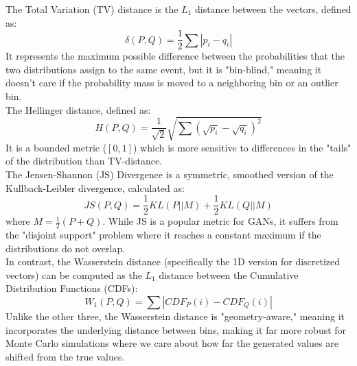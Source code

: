 The Total Variation (TV) distance is the $L_1$ distance between the vectors, defined as:
\begin{equation}
    \label{eq: TV_distance}
    \delta(P, Q) = \frac{1}{2} \sum |p_i - q_i|
\end{equation}
It represents the maximum possible difference between the probabilities that the two distributions assign to the same event,
but it is "bin-blind," meaning it doesn't care if the probability mass is moved to a neighboring bin or an outlier bin.\\
The Hellinger distance, defined as:
\begin{equation}
    H(P, Q) = \frac{1}{\sqrt{2}} \sqrt{\sum (\sqrt{p_i} - \sqrt{q_i})^2}
\end{equation}
It is a bounded metric ($[0, 1]$) which is more sensitive to differences in the "tails" of the distribution than TV-distance.\\
The Jensen-Shannon (JS) Divergence is a symmetric, smoothed version of the Kullback-Leibler divergence, calculated as:
\begin{equation}
    JS(P, Q) = \frac{1}{2}KL(P || M) + \frac{1}{2}KL(Q || M)
\end{equation}
where $M = \frac{1}{2}(P + Q)$. While JS is a popular metric for GANs, it suffers from the "disjoint support" problem where it reaches a constant maximum if the distributions do not overlap.\\
In contrast, the Wasserstein distance (specifically the 1D version for discretized vectors) can be computed as the $L_1$ distance between the Cumulative Distribution Functions (CDFs): 
\begin{equation}
    W_1(P, Q) = \sum |CDF_P(i) - CDF_Q(i)|
\end{equation}
Unlike the other three, the Wasserstein distance is "geometry-aware," meaning it incorporates the underlying distance between bins, making it far more robust for Monte Carlo simulations where we care about how far the generated values are shifted from the true values.

